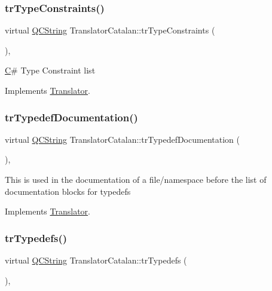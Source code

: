 \subsubsection{\texorpdfstring{trTypeConstraints()}{trTypeConstraints()}}
{\footnotesize\ttfamily virtual \mbox{\hyperlink{class_q_c_string}{Q\+C\+String}} Translator\+Catalan\+::tr\+Type\+Constraints (\begin{DoxyParamCaption}{ }\end{DoxyParamCaption})\hspace{0.3cm}{\ttfamily [inline]}, {\ttfamily [virtual]}}

\mbox{\hyperlink{class_c}{C}}\# Type Constraint list 

Implements \mbox{\hyperlink{class_translator}{Translator}}.

\mbox{\label{class_translator_catalan_ac868b3d58b1fce61192f3628a6207a05}} 
\subsubsection{\texorpdfstring{trTypedefDocumentation()}{trTypedefDocumentation()}}
{\footnotesize\ttfamily virtual \mbox{\hyperlink{class_q_c_string}{Q\+C\+String}} Translator\+Catalan\+::tr\+Typedef\+Documentation (\begin{DoxyParamCaption}{ }\end{DoxyParamCaption})\hspace{0.3cm}{\ttfamily [inline]}, {\ttfamily [virtual]}}

This is used in the documentation of a file/namespace before the list of documentation blocks for typedefs 

Implements \mbox{\hyperlink{class_translator}{Translator}}.

\mbox{\label{class_translator_catalan_a23551f903def26b56ed5259c1204b985}} 
\subsubsection{\texorpdfstring{trTypedefs()}{trTypedefs()}}
{\footnotesize\ttfamily virtual \mbox{\hyperlink{class_q_c_string}{Q\+C\+String}} Translator\+Catalan\+::tr\+Typedefs (\begin{DoxyParamCaption}{ }\end{DoxyParamCaption})\hspace{0.3cm}{\ttfamily [inline]}, {\ttfamily [virtual]}}

